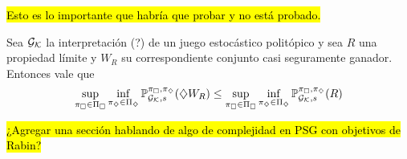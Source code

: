 \hl{Esto es lo importante que habría que probar y no está probado.}

\begin{lemma}
	\label{**2}
	Sea $\Gk$ la interpretación (?) de un juego estocástico politópico y sea $R$ una propiedad límite y $W_R$ su correspondiente conjunto casi seguramente ganador. Entonces vale que
	$$
		\sup_{\picuadset} \inf_{\pidiamset} \ProbG (\alc W_R) \leq \sup_{\picuadset} \inf_{\pidiamset}  \ProbG (R)
	$$
\end{lemma}

\hl{¿Agregar una sección hablando de algo de complejidad en PSG con objetivos de Rabin?}

